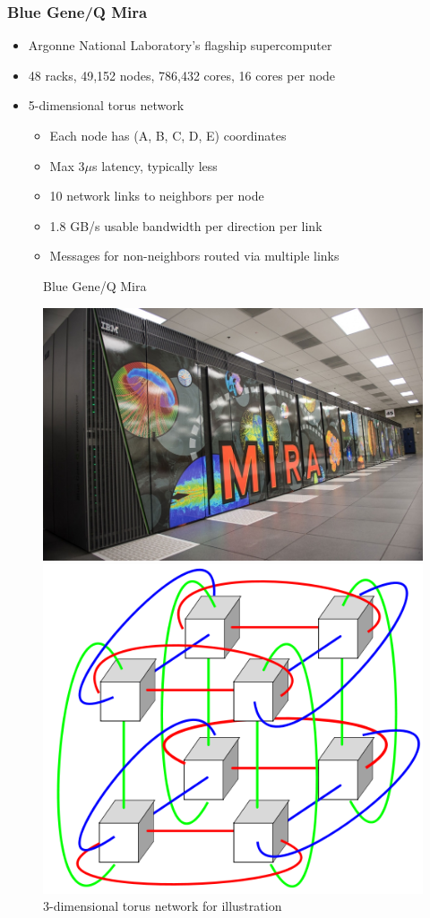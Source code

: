 \documentclass{beamer}
\begin{document}
\begin{frame}
\frametitle{Blue Gene/Q Mira}
\begin{itemize}
\item Argonne National Laboratory's flagship supercomputer
\item 48 racks, 49,152 nodes, 786,432 cores, 16 cores per node
\item 5-dimensional torus network
  \begin{itemize}
    \item Each node has (A, B, C, D, E) coordinates
    \item Max 3$\mu$s latency, typically less
    \item 10 network links to neighbors per node
    \item 1.8 GB/s usable bandwidth per direction per link
    \item Messages for non-neighbors routed via multiple links
  \end{itemize}
\end{itemize}
\vspace{-1.0em}
\centering
\begin{figure}
  \begin{minipage}{0.45\textwidth}
    \centering
    \caption{Blue Gene/Q Mira}
    \includegraphics[width=0.9\linewidth]{mira}
  \end{minipage}
  \begin{minipage}{0.45\textwidth}
    \centering
    \caption{3-dimensional torus network for illustration}
    \includegraphics[width=0.65\linewidth]{500px-2x2x2torus}
  \end{minipage}
\end{figure}
\end{frame}
\end{document}
